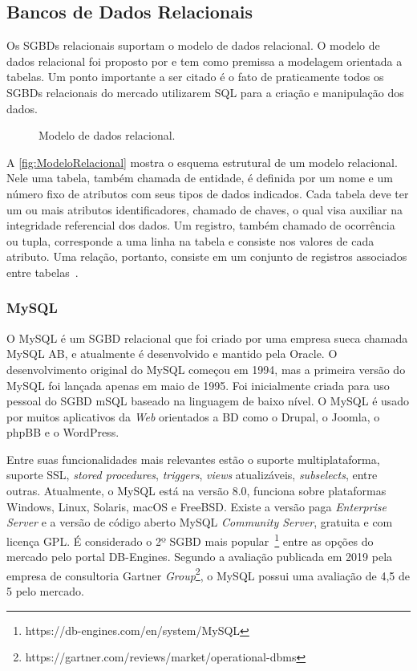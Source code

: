     \subsection{Bancos de Dados Relacionais} \label{ssec:SGBDRelacionais}

Os \acp{SGBD} relacionais suportam o modelo de dados relacional. 
O modelo de dados relacional foi proposto por  e tem como premissa a modelagem orientada a tabelas. 
Um ponto importante a ser citado é o fato de praticamente todos os \acp{SGBD} relacionais do mercado utilizarem \ac{SQL} para a criação e manipulação dos dados.

\begin{figure} [!htb]
    \centering
    \caption{Modelo de dados relacional.}
    \label{fig:ModeloRelacional}
    
\end{figure}

A \autoref{fig:ModeloRelacional} mostra o esquema estrutural de um modelo relacional. Nele uma tabela, também chamada de entidade, é definida por um nome e um número fixo de atributos com seus tipos de dados indicados. 
Cada tabela deve ter um ou mais atributos identificadores, chamado de chaves, o qual visa auxiliar na integridade referencial dos dados. 
Um registro, também chamado de ocorrência ou tupla, corresponde a uma linha na tabela e consiste nos valores de cada atributo. 
Uma relação, portanto, consiste em um conjunto de registros associados entre tabelas~\cite{Ramakrishnan:2002}.

\subsubsection{MySQL}
O MySQL é um \ac{SGBD} relacional que foi criado por uma empresa sueca chamada MySQL AB, e atualmente é desenvolvido e mantido pela Oracle. 
O desenvolvimento original do MySQL começou em 1994, mas a primeira versão do MySQL foi lançada apenas em maio de 1995. 
Foi inicialmente criada para uso pessoal do \ac{SGBD} mSQL baseado na linguagem de baixo nível. 
O MySQL é usado por muitos aplicativos da \textit{Web} orientados a \ac{BD} como o Drupal, o Joomla, o phpBB e o WordPress.
    
Entre suas funcionalidades mais relevantes estão o suporte multiplataforma, suporte SSL, \textit{stored procedures}, \textit{triggers}, \textit{views} atualizáveis, \textit{subselects}, entre outras. 
Atualmente, o MySQL está na versão 8.0, funciona sobre plataformas Windows, Linux, Solaris, macOS e FreeBSD. 
Existe a versão paga \textit{Enterprise Server} e a versão de código aberto MySQL \textit{Community Server}, gratuita e com licença GPL. 
É considerado o 2º \ac{SGBD} mais popular~\footnote{https://db-engines.com/en/system/MySQL} entre as opções do mercado pelo portal DB-Engines. 
Segundo a avaliação publicada em 2019 pela empresa de consultoria Gartner \textit{Group}\footnote{https://gartner.com/reviews/market/operational-dbms}, o MySQL possui uma avaliação de 4,5 de 5 pelo mercado.

